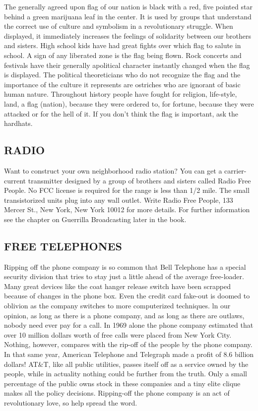 \documentclass[11pt,twoside,a4paper]{book}
\begin{document}
The generally agreed upon flag of our nation is black with a red, five pointed star behind a green marijuana leaf in the center. It is used by groups that understand the correct use of culture and symbolism in a revolutionary struggle. When displayed, it immediately increases the feelings of solidarity between our brothers and sisters. High school kids have had great fights over which flag to salute in school. A sign of any liberated zone is the flag being flown. Rock concerts and festivals have their generally apolitical character instantly changed when the flag is displayed. The political theoreticians who do not recognize the flag and the importance of the culture it represents are ostriches who are ignorant of basic human nature. Throughout history people have fought for religion, life-style, land, a flag (nation), because they were ordered to, for fortune, because they were attacked or for the hell of it. If you don't think the flag is important, ask the hardhats. 

\subsection{RADIO}

Want to construct your own neighborhood radio station? You can get a carrier-current transmitter designed by a group of brothers and sisters called Radio Free People. No FCC license is required for the range is less than 1/2 mile. The small transistorized units plug into any wall outlet. Write Radio Free People, 133 Mercer St., New York, New York 10012 for more details. For further information see the chapter on Guerrilla Broadcasting later in the book.

\subsection{FREE TELEPHONES}

Ripping off the phone company is so common that Bell Telephone has a special security division that tries to stay just a little ahead of the average free-loader. Many great devices like the coat hanger release switch have been scrapped because of changes in the phone box. Even the credit card fake-out is doomed to oblivion as the company switches to more computerized techniques. ln our opinion, as long as there is a phone company, and as long as there are outlaws, nobody need ever pay for a call. In 1969 alone the phone company estimated that over 10 million dollars worth of free calls were placed from New York City. Nothing, however, compares with the rip-off of the people by the phone company. In that same year, American Telephone and Telegraph made a profit of 8.6 billion dollars! AT\&T, like all public utilities, passes itself off as a service owned by the people, while in actuality nothing could be further from the truth. Only a small percentage of the public owns stock in these companies and a tiny elite clique makes all the policy decisions. Ripping-off the phone company is an act of revolutionary love, so help spread the word. 
\end{document}

